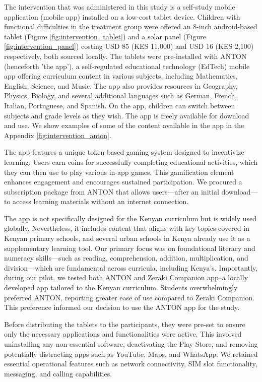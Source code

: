 \documentclass[hidelinks,12pt]{article}
\begin{document}
\begin{singlespace}
The intervention that was administered in this study is a self-study mobile application (mobile app) installed on a low-cost tablet device. Children with functional difficulties in the treatment group were offered an 8-inch android-based tablet (Figure \ref{fig:intervention_tablet}) and a solar panel (Figure \ref{fig:intervention_panel}) costing USD 85 (KES 11,000) and USD 16 (KES 2,100) respectively, both sourced locally. The tablets were pre-installed with ANTON (henceforth 'the app'), a self-regulated educational technology (EdTech) mobile app offering curriculum content in various subjects, including Mathematics, English, Science, and Music. The app also provides resources in Geography, Physics, Biology, and several additional languages such as German, French, Italian, Portuguese, and Spanish. On the app, children can switch between subjects and grade levels as they wish. The app is freely available for download and use. We show examples of some of the content available in the app in the Appendix \ref{fig:intervention_anton}.

The app features a unique token-based gaming system designed to incentivize learning. Users earn coins for successfully completing educational activities, which they can then use to play various in-app games. This gamification element enhances engagement and encourages sustained participation. We procured a subscription package from ANTON that allows users—after an initial download—to access learning materials without an internet connection.

The app is not specifically designed for the Kenyan curriculum but is widely used globally. Nevertheless, it includes content that aligns with key topics covered in Kenyan primary schools, and several urban schools in Kenya already use it as a supplementary learning tool. Our primary focus was on foundational literacy and numeracy skills—such as reading, comprehension, addition, multiplication, and division—which are fundamental across curricula, including Kenya’s. Importantly, during our pilot, we tested both ANTON and Zeraki Companion app–a locally developed app tailored to the Kenyan curriculum. Students overwhelmingly preferred ANTON, reporting greater ease of use compared to Zeraki Companion. This preference informed our decision to use the ANTON app for the study.

Before distributing the tablets to the participants, they were pre-set to ensure only the necessary applications and functionalities were active. This involved uninstalling any non-essential software, deactivating the Play Store, and removing potentially distracting apps such as YouTube, Maps, and WhatsApp. We retained essential operational features such as network connectivity, SIM slot functionality, messaging, and calling capabilities.


\end{singlespace}
\end{document}
